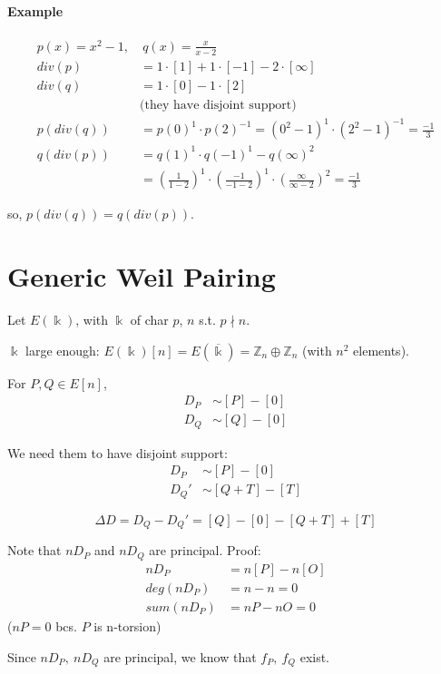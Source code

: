 \documentclass{article}
\theoremstyle{definition}
\begin{document}
\paragraph{Example}
\begin{align*}
  p(x)=x^2 - 1,&~ q(x)=\frac{x}{x-2}\\
  div(p)&= 1 \cdot [1] + 1 \cdot [-1] - 2 \cdot [\infty]\\
  div(q)&= 1 \cdot [0] - 1 \cdot [2]\\
	&\text{(they have disjoint support)}\\
  p(div(q)) &= p(0)^1 \cdot p(2)^{-1}= (0^2 - 1)^1 \cdot (2^2 - 1)^{-1} = \frac{-1}{3}\\
  q(div(p)) &= q(1)^1 \cdot q(-1)^1 - q(\infty)^2\\
	    &= (\frac{1}{1-2})^1 \cdot (\frac{-1}{-1-2})^1 \cdot (\frac{\infty}{\infty - 2})^2 = \frac{-1}{3}
\end{align*}

so, $p(div(q))=q(div(p))$.

\section{Generic Weil Pairing}
Let $E(\Bbbk)$, with $\Bbbk$ of char $p$, $n$ s.t. $p \nmid n$.

$\Bbbk$ large enough: $E(\Bbbk)[n] = E(\overline{\Bbbk}) = \mathbb{Z}_n \oplus \mathbb{Z}_n$ (with $n^2$ elements).

For $P, Q \in E[n]$,
\begin{align*}
  D_P &\sim [P] - [0]\\
  D_Q &\sim [Q] - [0]
\end{align*}

We need them to have disjoint support:
\begin{align*}
  D_P &\sim [P] - [0]\\
  D_Q' &\sim [Q+T] - [T]
\end{align*}

$$\Delta D = D_Q - D_Q' = [Q] - [0] - [Q+T] + [T]$$


Note that $n D_P$ and $n D_Q$ are principal. Proof:
\begin{align*}
  n D_P &= n [P] - n [O]\\
  deg(n D_P) &= n - n = 0\\
  sum(n D_P) &= nP - nO = 0
\end{align*}
($nP = 0$ bcs. $P$ is n-torsion)

Since $n D_P,~ n D_Q$ are principal, we know that $f_P,~ f_Q$ exist.
\end{document}
